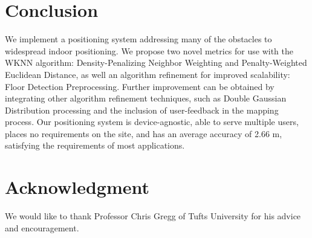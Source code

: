 \documentclass[conference]{IEEEtran}
\begin{document}
\section{Conclusion}
We implement a positioning system addressing many of the obstacles to widespread indoor positioning. We propose two novel metrics for use with the WKNN algorithm: Density-Penalizing Neighbor Weighting and Penalty-Weighted Euclidean Distance, as well an algorithm refinement for improved scalability: Floor Detection Preprocessing. Further improvement can be obtained by integrating other algorithm refinement techniques, such as Double Gaussian Distribution processing and the inclusion of user-feedback in the mapping process. Our positioning system is device-agnostic, able to serve multiple users, places no requirements on the site, and has an average accuracy of 2.66 m, satisfying the requirements of most applications.

\section*{Acknowledgment}
We would like to thank Professor Chris Gregg of Tufts University for his advice and encouragement.


\end{document}
